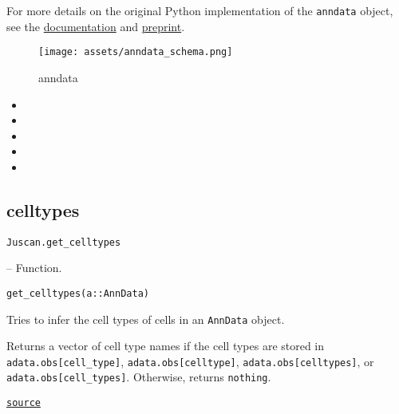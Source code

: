 \documentclass[oneside]{memoir}
\begin{document}
For more details on the original Python implementation of the \texttt{anndata} object, see the \href{https://anndata.readthedocs.io/en/latest/}{documentation} and \href{https://doi.org/10.1101/2021.12.16.473007}{preprint}.



\begin{figure}
\centering
\texttt{[image: assets/anndata\_schema.png]}
\caption{anndata}
\end{figure}



\begin{itemize}
\item {}
\item {}
\item {}
\item {}
\item {}
\end{itemize}


\subsection{celltypes}



\label{5500776454038897893}{}

\hypertarget{2502770603687263729}{\texttt{Juscan.get\_celltypes}}  -- {Function.}

\begin{adjustwidth}{2em}{0pt}


\begin{verbatim}
get_celltypes(a::AnnData)
\end{verbatim}

Tries to infer the cell types of cells in an \texttt{AnnData} object. 

Returns a vector of cell type names if the cell types are stored in  \texttt{adata.obs[{\textquotedbl}cell\_type{\textquotedbl}]}, \texttt{adata.obs[{\textquotedbl}celltype{\textquotedbl}]}, \texttt{adata.obs[{\textquotedbl}celltypes{\textquotedbl}]}, or \texttt{adata.obs[{\textquotedbl}cell\_types{\textquotedbl}]}.  Otherwise, returns \texttt{nothing}.



\href{https://github.com/zehua0417/Juscan.jl/blob/393ad1b827b678ea98a738f92af658ee9ed9a403/src/anndata.jl#L46-L54}{\texttt{source}}


\end{adjustwidth}
\end{document}
